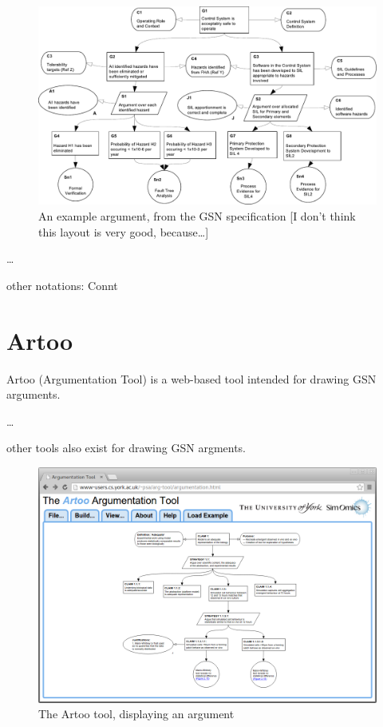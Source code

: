 \documentclass[authoryearcitations]{UoYCSproject}
\begin{document}
\begin{figure}
    \centering
    \includegraphics[width=\textwidth]{example_argument.pdf}
    \caption{An example argument, from the GSN specification [I don't think this layout is very good, because\ldots]    }
\end{figure}

\ldots

other notations: Connt

\section{Artoo}

Artoo (Argumentation Tool) is a web-based tool intended for drawing GSN arguments.

\ldots

other tools also exist for drawing GSN argments.

\begin{figure}
    \centering
    \includegraphics[width=\textwidth]{graphics/artoo_screenshot.png}
    \caption{The Artoo tool, displaying an argument }
\end{figure}
\end{document}
